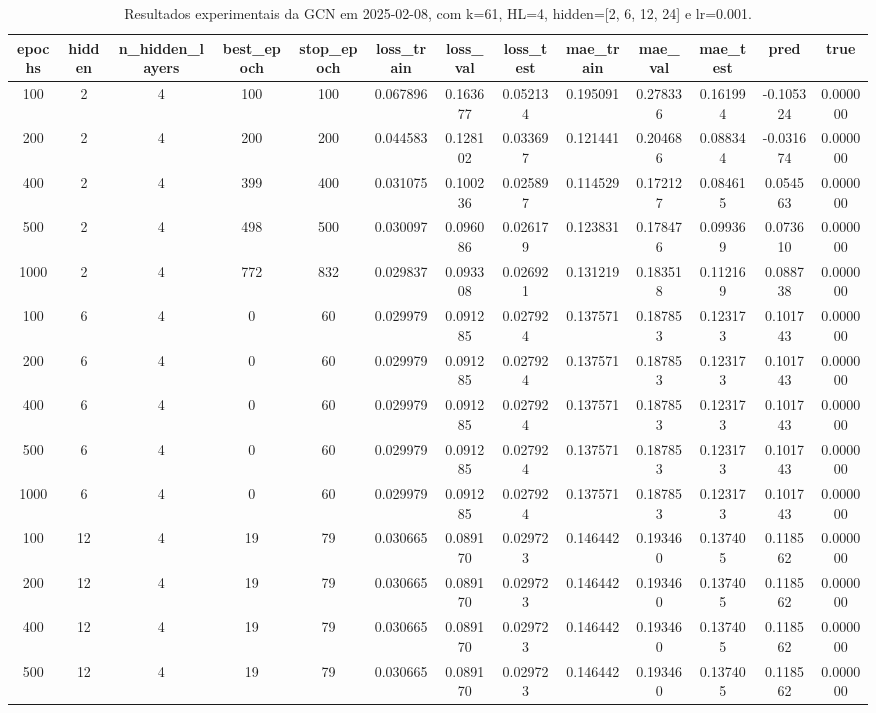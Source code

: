 \begin{table}[h]
\centering
\caption{Resultados experimentais da GCN em 2025-02-08, com k=61, HL=4, hidden=[2, 6, 12, 24] e lr=0.001.}
\label{tab:gcn_results_k61_hl4_d20250208}
\begin{tabular}{ccccccccccccc}
\toprule
epochs & hidden & n\_hidden\_layers & best\_epoch & stop\_epoch & loss\_train & loss\_val & loss\_test & mae\_train & mae\_val & mae\_test & pred & true \\
\midrule
100 & 2 & 4 & 100 & 100 & 0.067896 & 0.163677 & 0.052134 & 0.195091 & 0.278336 & 0.161994 & -0.105324 & 0.000000 \\
200 & 2 & 4 & 200 & 200 & 0.044583 & 0.128102 & 0.033697 & 0.121441 & 0.204686 & 0.088344 & -0.031674 & 0.000000 \\
400 & 2 & 4 & 399 & 400 & 0.031075 & 0.100236 & 0.025897 & 0.114529 & 0.172127 & 0.084615 & 0.054563 & 0.000000 \\
500 & 2 & 4 & 498 & 500 & 0.030097 & 0.096086 & 0.026179 & 0.123831 & 0.178476 & 0.099369 & 0.073610 & 0.000000 \\
1000 & 2 & 4 & 772 & 832 & 0.029837 & 0.093308 & 0.026921 & 0.131219 & 0.183518 & 0.112169 & 0.088738 & 0.000000 \\
100 & 6 & 4 & 0 & 60 & 0.029979 & 0.091285 & 0.027924 & 0.137571 & 0.187853 & 0.123173 & 0.101743 & 0.000000 \\
200 & 6 & 4 & 0 & 60 & 0.029979 & 0.091285 & 0.027924 & 0.137571 & 0.187853 & 0.123173 & 0.101743 & 0.000000 \\
400 & 6 & 4 & 0 & 60 & 0.029979 & 0.091285 & 0.027924 & 0.137571 & 0.187853 & 0.123173 & 0.101743 & 0.000000 \\
500 & 6 & 4 & 0 & 60 & 0.029979 & 0.091285 & 0.027924 & 0.137571 & 0.187853 & 0.123173 & 0.101743 & 0.000000 \\
1000 & 6 & 4 & 0 & 60 & 0.029979 & 0.091285 & 0.027924 & 0.137571 & 0.187853 & 0.123173 & 0.101743 & 0.000000 \\
100 & 12 & 4 & 19 & 79 & 0.030665 & 0.089170 & 0.029723 & 0.146442 & 0.193460 & 0.137405 & 0.118562 & 0.000000 \\
200 & 12 & 4 & 19 & 79 & 0.030665 & 0.089170 & 0.029723 & 0.146442 & 0.193460 & 0.137405 & 0.118562 & 0.000000 \\
400 & 12 & 4 & 19 & 79 & 0.030665 & 0.089170 & 0.029723 & 0.146442 & 0.193460 & 0.137405 & 0.118562 & 0.000000 \\
500 & 12 & 4 & 19 & 79 & 0.030665 & 0.089170 & 0.029723 & 0.146442 & 0.193460 & 0.137405 & 0.118562 & 0.000000 \\

\end{tabular}
\end{table}
